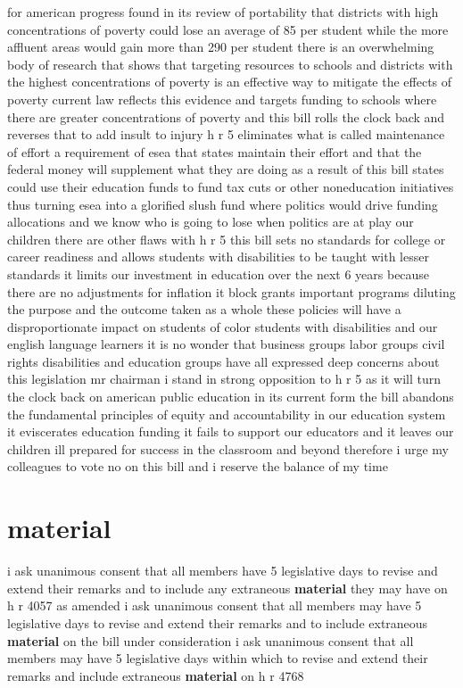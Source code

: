 \documentclass{article}
\begin{document}
for american progress found in its review of portability that districts with high concentrations of poverty could lose an average of 85 per student while the more affluent areas would gain more than 290 per student there is an overwhelming body of research that shows that targeting resources to schools and districts with the highest concentrations of poverty is an effective way to mitigate the effects of poverty current law reflects this evidence and targets funding to schools where there are greater concentrations of poverty and this bill rolls the clock back and reverses that to add insult to injury h r 5 eliminates what is called maintenance of effort a requirement of esea that states maintain their effort and that the federal money will supplement what they are doing as a result of this bill states could use their education funds to fund tax cuts or other noneducation initiatives thus turning esea into a glorified slush fund where politics would drive funding allocations and we know who is going to lose when politics are at play our children there are other flaws with h r 5 this bill sets no standards for college or career readiness and allows students with disabilities to be taught with lesser standards it limits our investment in education over the next 6 years because there are no adjustments for inflation it block grants important programs diluting the purpose and the outcome taken as a whole these policies will have a disproportionate impact on students of color students with disabilities and our english language learners it is no wonder that business groups labor groups civil rights disabilities and education groups have all expressed deep concerns about this legislation mr chairman i stand in strong opposition to h r 5 as it will turn the clock back on american public education in its current form the bill abandons the fundamental principles of equity and accountability in our education system it eviscerates education funding it fails to support our educators and it leaves our children ill prepared for success in the classroom and beyond therefore i urge my colleagues to vote no on this bill and i reserve the balance of my time\pagebreak

\section*{material}
i ask unanimous consent that all members have 5 legislative days to revise and extend their remarks and to include any extraneous {\bf \color{red} material} they may have on h r 4057 as amended
\vspace{8mm}
i ask unanimous consent that all members may have 5 legislative days to revise and extend their remarks and to include extraneous {\bf \color{red} material} on the bill under consideration
\vspace{8mm}
i ask unanimous consent that all members may have 5 legislative days within which to revise and extend their remarks and include extraneous {\bf \color{red} material} on h r 4768\pagebreak
\end{document}
